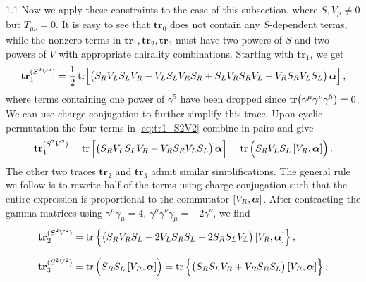 \documentclass[a4paper,12pt]{article}
\def\mat#1{\boldsymbol{#1}}
\def\alphamat{\mat{\alpha}}
\def\btr{\mathbf{tr}}
\begin{document}
\begin{spacing}{1.1}
Now we apply these constraints to the case of this subsection, where $S, V_\mu \ne 0$ but $T_{\mu\nu}=0$. It is easy to see that $\btr_0$ does not contain any $S$-dependent terms, while the nonzero terms in $\btr_1, \btr_2, \btr_3$ must have two powers of $S$ and two powers of $V$ with appropriate chirality combinations. Starting with $\btr_1$, we get
\begin{equation}
\btr_1^{(S^2V^2)} = \frac12 \tr \Bigl[ \bigl( S_R V_L S_L V_R - V_L S_L V_R S_R + S_L V_R S_R V_L - V_R S_R V_L S_L \bigr)\, \alphamat\Bigr] \,,
\label{eq:tr1_S2V2}
\end{equation}
where terms containing one power of $\gamma^5$ have been dropped since $\tr (\gamma^\mu\gamma^\nu\gamma^5)=0$. We can use charge conjugation to further simplify this trace. Upon cyclic permutation the four terms in \cref{eq:tr1_S2V2} combine in pairs and give
\begin{align}
\btr_1^{(S^2V^2)} = \tr \Big[ \bigl( S_R V_L S_L V_R - V_R S_R V_L S_L \bigr)\, \alphamat \Big] = \tr \Big( S_R V_L S_L\, \comm{V_R}{\alphamat} \Big) \,.
\label{eq:tr1_S2V2_combine}
\end{align}
The other two traces $\btr_2$ and $\btr_3$ admit similar simplifications. The general rule we follow is to rewrite half of the terms using charge conjugation such that the entire expression is proportional to the commutator $\comm{V_R}{\alphamat}$. After contracting the gamma matrices using $\gamma^\mu\gamma_\mu = 4$, $\gamma^\mu \gamma^\nu \gamma_\mu = -2\gamma^\nu$, we find
\begin{subequations}
\begin{align}
\btr_2^{(S^2V^2)} &= \tr \Big\{ \bigl( S_R V_R S_L - 2 V_L S_R S_L - 2 S_R S_L V_L \bigr)\, \comm{V_R}{\alphamat} \Big\} \,, \\[8pt]
\btr_3^{(S^2V^2)} &= \tr \Big( S_R S_L\, \comm{V_R}{\alphamat} \Big)
= \tr \Big\{ \bigl( S_R S_L V_R + V_R S_R S_L \bigr)\, \comm{V_R}{\alphamat} \Big\} \,.
\end{align}
\end{subequations}


\end{spacing}
\end{document}
